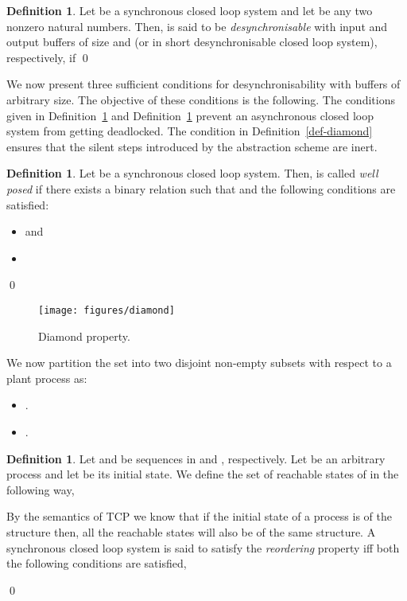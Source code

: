 \documentclass[copyright]{eptcs}
\theoremstyle{plain}
\theoremstyle{definition}
\newtheorem{definition}[theorem]{Definition}
\newcommand{\bag}{\ensuremath{B}}
\begin{document}
\newcommand{\bagmn}{\ensuremath{\bag^{m,n}}}

\begin{definition}\label{def-desyncl}
Let  be a synchronous closed loop system and let  be any two nonzero natural numbers. Then,  is said to be \textit{desynchronisable} with input and output buffers of size  and  (or in short desynchronisable closed loop system), respectively, if 
\qed
\end{definition}

We now present three sufficient conditions for desynchronisability with buffers of arbitrary size. The objective of these conditions is the following. The conditions given in Definition~\ref{def-wellposed} and Definition~\ref{def-reordering} prevent an asynchronous closed loop system from getting deadlocked. The condition in Definition~\ref{def-diamond} ensures that the silent steps introduced by the abstraction scheme are inert.

\begin{definition}\label{def-wellposed}
Let  be a synchronous closed loop system. Then,  is called \textit{well posed} if there exists a binary relation  such that  and the following conditions are satisfied:
\begin{itemize}
\item  and
\item 
\end{itemize}
\qed
\end{definition}

\begin{figure}\centering
\texttt{[image: figures/diamond]}
\caption{Diamond property.}\label{diamond-fig}
\end{figure}

We now partition \label{partition} the set  into two disjoint non-empty subsets  with respect to a plant process  as:
\begin{itemize}
\item .
\item .
\end{itemize}

\begin{definition}\label{def-reordering}
Let  and  be sequences in  and , respectively. Let  be an arbitrary process and let  be its initial state. We define the set of reachable states of  in the following way,
    
    By the semantics of TCP we know that if the initial state of a process is of the structure  then, all the reachable states will also be of the same structure. A synchronous closed loop system  is said to satisfy the \textit{reordering} property iff both the following conditions are satisfied,
    
\qed
\end{definition}
\end{document}
